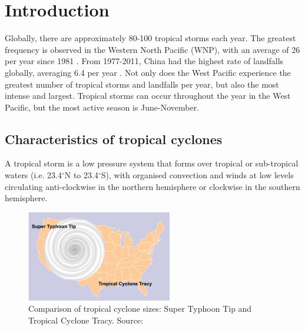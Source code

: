 
\graphicspath{{Chapter1/Figs/}}

\chapter{Introduction}  %

Globally, there are approximately 80-100 tropical storms each year. The greatest frequency is observed in the Western North Pacific (WNP), with an average of 26 per year since 1981 \citep{zhan2012seasonal}. From 1977-2011, China had the highest rate of landfalls globally, averaging 6.4 per year \citep{HironoriFudeyasu:178}. Not only does the West Pacific experience the greatest number of tropical storms and landfalls per year, but also the most intense and largest. Tropical storms can occur throughout the year in the West Pacific, but the most active season is June-November.


\section{Characteristics of tropical cyclones}

A tropical storm is a low pressure system that forms over tropical or sub-tropical waters (i.e. 23.4$^{\circ}$N to  23.4$^{\circ}$S), with organised convection and winds at low levels circulating anti-clockwise in the northern hemisphere or clockwise in the southern hemisphere. 

\begin{figure}[h]
	\centering
	\noindent\includegraphics[width=15pc,angle=0]{typhoonsizes.jpg}
	\caption{Comparison of tropical cyclone sizes: Super Typhoon Tip and Tropical Cyclone Tracy. Source: \cite{noaa_structure}}\label{fig:cyclone_size}
\end{figure}

